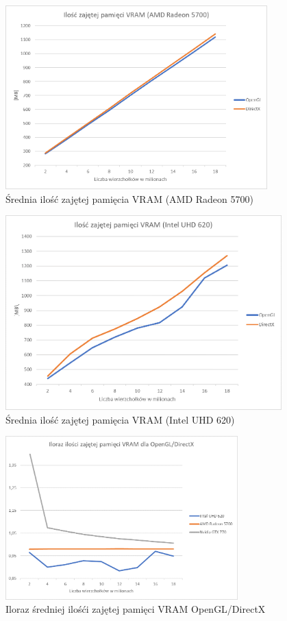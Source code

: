 \documentclass[archive]{mgr}
\begin{document}
\begin{figure}[h!]
  \centering
    \includegraphics[width=0.9\textwidth]{images/vram/2.png}
   \caption{Średnia ilość zajętej pamięcia VRAM (AMD Radeon 5700)}
   \label{lab:82}
\end{figure}
\bigbreak
\begin{figure}[h!]
  \centering
    \includegraphics[width=0.95\textwidth]{images/vram/3.png}
   \caption{Średnia ilość zajętej pamięcia VRAM (Intel UHD 620)}
   \label{lab:83}
\end{figure}

\begin{figure}[h!]
  \centering
    \includegraphics[width=0.80\textwidth]{images/vram/4.png}
   \caption{Iloraz średniej ilośći zajętej pamięci VRAM OpenGL/DirectX}
   \label{lab:84}
\end{figure}
\newpage
\end{document}
